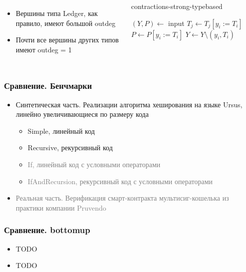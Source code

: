 \documentclass{beamer}
\begin{document}
\begin{frame}
\begin{columns}
  \begin{itemize}
    \item Вершины типа Ledger, как правило, имеют большой outdeg
    \item Почти все вершины других типов имеют outdeg = 1
  \end{itemize}
  \begin{megaalgorithm}\tiny 
    \caption{\tiny contractions-strong-typebased}
  \begin{algorithmic}
    \State $(Y, P)\gets$ input
        \If{\textcolor{red}{$typeof(y_i)$ is not $Ledger$}}
                \State $T_j \gets T_j [y_i := T_i]$
            \EndFor
            \State $P \gets P [y_i := T_i]$
            \State $Y\gets Y \setminus (y_i, T_i)$
        \EndIf
    \EndFor
    \State {}
  \end{algorithmic}
\end{megaalgorithm}  
  \end{columns}
\end{frame}

\begin{frame}\frametitle{Сравнение. Бенчмарки}
  \begin{itemize}
    \item Синтетическая часть. Реализации алгоритма хеширования на языке Ursus, линейно увеличивающиеся по размеру кода
    \begin{itemize}
      \item Simple, линейный код
      \item Recursive, рекурсивный код
      \item \textcolor{gray}{If, линейный код с условными операторами}
      \item \textcolor{gray}{IfAndRecursion, рекурсивный код с условными операторами}
    \end{itemize}
    \item \textcolor{gray}{Реальная часть. Верификация смарт-контракта мультисиг-кошелька из практики компании Pruvendo}
  \end{itemize}
  \end{frame}

\begin{frame}\frametitle{Сравнение. bottomup}
\begin{itemize}
  \item TODO
  \item TODO
\end{itemize}
\end{frame}
\end{document}
